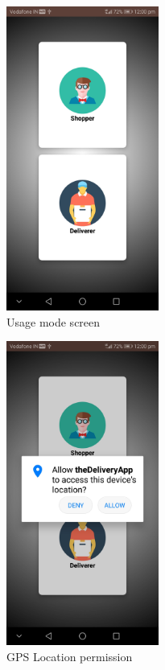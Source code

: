 \documentclass{report}
\begin{document}
\begin{figure}[h!]
\begin{subfigure}[b]{.3\textwidth}
\centering
\includegraphics[width=5cm]{main_screen.jpg}
\caption{\centering Usage mode screen}
\end{subfigure}
\begin{subfigure}[b]{.3\textwidth}
\centering
\includegraphics[width=5cm]{location_permission.jpg}
\caption{\centering GPS Location permission}
\end{subfigure}
\begin{subfigure}[b]{.3\textwidth}
\centering

\end{subfigure}
\end{figure}
\end{document}
